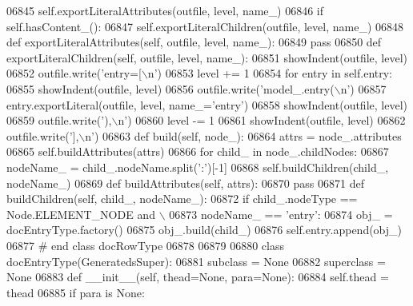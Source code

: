 \begin{DoxyCode}
{{{{{{{{{{{{{{{{{{{{{{{{{{{{{{{{{{{{{{{{{{{{{{{{{{{{{{{{{{{{{{{{{{{{{{{{{{{{{{{{{{{{{{{{{{{{{{{{{{{{{{{{{{{{{{{{{{{{{{{{{{{{{{{{{{{{{{{{{{{{{{{{{{{{{{{{{{{{{{{{{{{{{{{{{{{{{{{{{{{{{{{{{{{{{{{{{{{{{{{{{{{{{{{{{{{{{{{{{{{{{{{{{{{{{{{{{{{{{{{{{{{{{{{{{{{{{{{{{{{{{{{{{{{{{{{{{{{{{{{{{{{{{{{{{{{{{{{{{{{{{{{{{{{{{{{{{{{{{{{{{{{{{{{{{{{{{{{{{{{{{{{{{{{{{{{{{{{{{{{{{{{{{{{{{{{{{{{{{{{{{{{{{{{{{{{{{{{{{{{{{{{{{{{{{{{{{{{{{{{{{{{{06845         self.exportLiteralAttributes(outfile, level, name\_)
06846         \textcolor{keywordflow}{if} self.hasContent_():
06847             self.exportLiteralChildren(outfile, level, name\_)
06848     \textcolor{keyword}{def }exportLiteralAttributes(self, outfile, level, name\_):
06849         \textcolor{keywordflow}{pass}
06850     \textcolor{keyword}{def }exportLiteralChildren(self, outfile, level, name\_):
06851         showIndent(outfile, level)
06852         outfile.write(\textcolor{stringliteral}{'entry=[\(\backslash\)n'})
06853         level += 1
06854         \textcolor{keywordflow}{for} entry \textcolor{keywordflow}{in} self.entry:
06855             showIndent(outfile, level)
06856             outfile.write(\textcolor{stringliteral}{'model\_.entry(\(\backslash\)n'})
06857             entry.exportLiteral(outfile, level, name\_=\textcolor{stringliteral}{'entry'})
06858             showIndent(outfile, level)
06859             outfile.write(\textcolor{stringliteral}{'),\(\backslash\)n'})
06860         level -= 1
06861         showIndent(outfile, level)
06862         outfile.write(\textcolor{stringliteral}{'],\(\backslash\)n'})
06863     \textcolor{keyword}{def }build(self, node\_):
06864         attrs = node\_.attributes
06865         self.buildAttributes(attrs)
06866         \textcolor{keywordflow}{for} child\_ \textcolor{keywordflow}{in} node\_.childNodes:
06867             nodeName\_ = child\_.nodeName.split(\textcolor{stringliteral}{':'})[-1]
06868             self.buildChildren(child\_, nodeName\_)
06869     \textcolor{keyword}{def }buildAttributes(self, attrs):
06870         \textcolor{keywordflow}{pass}
06871     \textcolor{keyword}{def }buildChildren(self, child\_, nodeName\_):
06872         \textcolor{keywordflow}{if} child\_.nodeType == Node.ELEMENT\_NODE \textcolor{keywordflow}{and} \(\backslash\)
06873             nodeName\_ == \textcolor{stringliteral}{'entry'}:
06874             obj\_ = docEntryType.factory()
06875             obj\_.build(child\_)
06876             self.entry.append(obj\_)
06877 \textcolor{comment}{# end class docRowType}
06878 
06879 
06880 \textcolor{keyword}{class }docEntryType(GeneratedsSuper):
06881     subclass = \textcolor{keywordtype}{None}
06882     superclass = \textcolor{keywordtype}{None}
06883     \textcolor{keyword}{def }__init__(self, thead=None, para=None):
06884         self.thead = thead
06885         \textcolor{keywordflow}{if} para \textcolor{keywordflow}{is} \textcolor{keywordtype}{None}:
}}}}}}}}}}}}}}}}}}}}}}}}}}}}}}}}}}}}}}}}}}}}}}}}}}}}}}}}}}}}}}}}}}}}}}}}}}}}}}}}}}}}}}}}}}}}}}}}}}}}}}}}}}}}}}}}}}}}}}}}}}}}}}}}}}}}}}}}}}}}}}}}}}}}}}}}}}}}}}}}}}}}}}}}}}}}}}}}}}}}}}}}}}}}}}}}}}}}}}}}}}}}}}}}}}}}}}}}}}}}}}}}}}}}}}}}}}}}}}}}}}}}}}}}}}}}}}}}}}}}}}}}}}}}}}}}}}}}}}}}}}}}}}}}}}}}}}}}}}}}}}}}}}}}}}}}}}}}}}}}}}}}}}}}}}}}}}}}}}}}}}}}}}}}}}}}}}}}}}}}}}}}}}}}}}}}}}}}}}}}}}}}}}}}}}}}}}}}}}}}}}}}}}}}}}}}}}}}}}}}}}}}
\end{DoxyCode}
